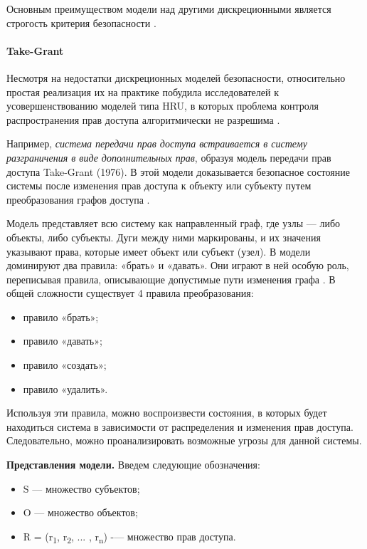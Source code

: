 Основным преимуществом модели над другими дискреционными является строгость критерия безопасности \autocite{WikiHRU}.

\paragraph{Take-Grant}

Несмотря на недостатки дискреционных моделей безопасности, относительно простая реализация их на практике побудила
исследователей к усовершенствованию моделей типа HRU, в которых проблема контроля распространения прав доступа
алгоритмически не разрешима \autocite{URFULecture10Models}.

Например, \textit{система передачи прав доступа встраивается в систему разграничения в виде дополнительных прав}, образуя
модель передачи прав доступа Take-Grant (1976). В этой модели доказывается безопасное состояние системы после
изменения прав доступа к объекту или субъекту путем преобразования графов доступа \autocite{URFULecture10Models}.

Модель представляет всю систему как направленный граф, где узлы --- либо объекты, либо субъекты. Дуги между ними
маркированы, и их значения указывают права, которые имеет объект или субъект (узел). В модели доминируют два правила:
«брать» и «давать». Они играют в ней особую роль, переписывая правила, описывающие допустимые пути изменения графа \autocite{WikiTakeGrant}.
В общей сложности существует 4 правила преобразования:
\begin{itemize}
    \item правило «брать»;
    \item правило «давать»;
    \item правило «создать»;
    \item правило «удалить».
\end{itemize}
Используя эти правила, можно воспроизвести состояния, в которых будет находиться система в зависимости от распределения
и изменения прав доступа. Следовательно, можно проанализировать возможные угрозы для данной системы.

\textbf{Представления модели.} Введем следующие обозначения:
\begin{itemize}
    \item S --- множество субъектов;
    \item O --- множество объектов;
    \item R = (r\textsubscript{1}, r\textsubscript{2}, ... , r\textsubscript{n}) -— множество прав доступа.
\end{itemize}

